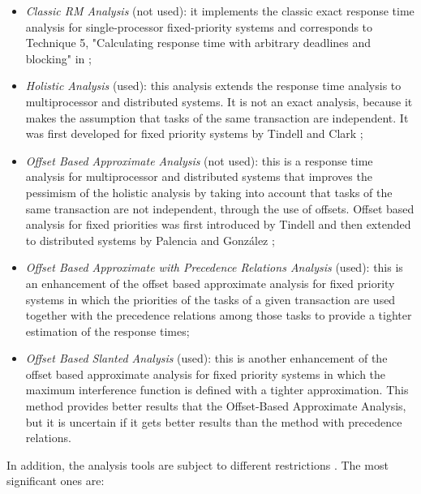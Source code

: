 \documentclass{article}
\begin{document}
\begin{itemize}
   \item \textit{Classic RM Analysis} (not used): it implements the classic exact response time analysis for single-processor fixed-priority systems and corresponds to Technique 5, "Calculating response time with arbitrary deadlines and blocking" in \cite{practitioner};
   \item \textit{Holistic Analysis} (used): this analysis extends the response time analysis to multiprocessor and distributed systems. It is not an exact analysis, because it makes the assumption that tasks of the same transaction are independent. It was first developed for fixed priority systems by Tindell and Clark \cite{holistic-analysis};
   \item \textit{Offset Based Approximate Analysis} (not used): this is a response time analysis for multiprocessor and distributed systems that improves the pessimism of the holistic analysis by taking into account that tasks of the same transaction are not independent, through the use of offsets. Offset based analysis for fixed priorities was first introduced by Tindell \cite{tindell-offsets} and then extended to distributed systems by Palencia and González \cite{pessimistic-rma};
   \item \textit{Offset Based Approximate with Precedence Relations Analysis} (used): this is an enhancement of the offset based approximate analysis for fixed priority systems in which the priorities of the tasks of a given transaction are used together with the precedence relations among those tasks to provide a tighter estimation of the response times;
   \item \textit{Offset Based Slanted Analysis} (used): this is another enhancement of the offset based approximate analysis for fixed priority systems in which the maximum interference function is defined with a tighter approximation. This method provides better results that the Offset-Based Approximate Analysis, but it is uncertain if it gets better results than the method with precedence relations.
\end{itemize}

In addition, the analysis tools are subject to different restrictions \cite{mast-restrictions}. The most significant ones are:
\end{document}
